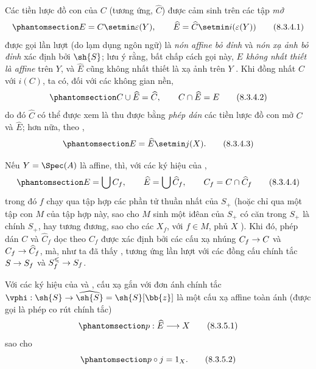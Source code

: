 \documentclass[oneside,10pt]{amsart}
\makeatletter
\renewcommand{\leq}{\leqslant}
\newcommand{\ega@arrow}[2]{\mathchoice{#1}{#2}{#2}{#2}}
\renewcommand{\to}{\ega@arrow{\longrightarrow}{\rightarrow}}
\newcommand{\oldpage}[2][]{\marginnote{\normalfont\footnotesize\textbf{#1}~|~#2}\ignorespaces}
\let\EGAOriginalLabel\label
\renewcommand{\label}[1]{\phantomsection\EGAOriginalLabel{#1}}
\makeatother
\begin{document}
\begin{env}[8.3.4]
\label{II.8.3.4}
Các tiền lược đồ con của $C$ (tương ứng, $\widehat{C}$) được cảm sinh trên các tập \emph{mở}
\[
\label{II.8.3.4.1}
  E = C \setmin \varepsilon(Y),
  \qquad
  \widehat{E} = \widehat{C} \setmin i(\varepsilon(Y))
\tag{8.3.4.1}
\]
được gọi lần lượt (do lạm dụng ngôn ngữ) là \emph{nón affine bỏ đỉnh} và \emph{nón xạ ảnh bỏ đỉnh} xác định bởi $\sh{S}$;
lưu ý rằng, bất chấp cách gọi này, \emph{$E$ không nhất thiết là affine} trên $Y$, và $\widehat{E}$ cũng không nhất thiết là xạ ảnh trên $Y$ .
Khi đồng nhất $C$ với $i(C)$, ta có, đối với các không gian nền,
\[
\label{II.8.3.4.2}
  C \cup \widehat{E} = \widehat{C},
  \qquad
  C \cap \widehat{E} = E
\tag{8.3.4.2}
\]
do đó $\widehat{C}$ có thể được xem là thu được bằng \emph{phép dán} các tiền lược đồ con mở $C$ và $\widehat{E}$;
hơn nữa, theo ,
\[
\label{II.8.3.4.3}
  E = \widehat{E} \setmin j(X).
\tag{8.3.4.3}
\]

\oldpage[II]{165}
Nếu $Y=\Spec(A)$ là affine, thì, với các ký hiệu của ,
\[
\label{II.8.3.4.4}
  E = \bigcup C_f,
  \qquad
  \widehat{E} = \bigcup \widehat{C}_f,
  \qquad
  C_f = C \cap \widehat{C}_f
\tag{8.3.4.4}
\]
trong đó $f$ chạy qua tập hợp các phần tử thuần nhất của $S_+$ (hoặc chỉ qua một tập con $M$ của tập hợp này, sao cho $M$ sinh một iđêan của $S_+$ có căn trong $S_+$ là chính $S_+$, hay tương đương, sao cho các $X_f$, với $f\in M$, phủ $X$ ).
Khi đó, phép dán $C$ và $\widehat{C}_f$ dọc theo $C_f$ được xác định bởi các cấu xạ nhúng $C_f\to C$ và $C_f\to\widehat{C}_f$, mà, như ta đã thấy , tương ứng lần lượt với các đồng cấu chính tắc $S\to S_f$ và $S_f^\leq\to S_f$.
\end{env}
\begin{proposition}[8.3.5]
\label{II.8.3.5}
Với các ký hiệu của  và , cấu xạ gắn  với đơn ánh chính tắc $\vphi:\sh{S} \to \widehat{\sh{S}} = \sh{S}[\bb{z}]$ là một cấu xạ affine toàn ánh (được gọi là phép co rút chính tắc)
\[
\label{II.8.3.5.1}
  p:\widehat{E} \to X
\tag{8.3.5.1}
\]
sao cho
\[
\label{II.8.3.5.2}
  p \circ j = 1_X.
\tag{8.3.5.2}
\]
\end{proposition}
\end{document}
